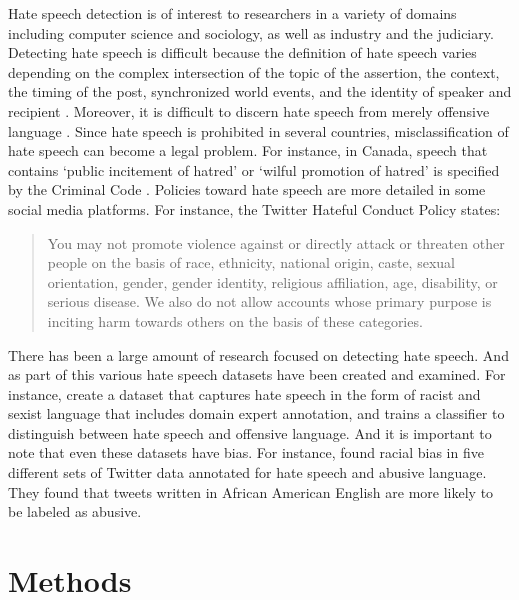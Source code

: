 \documentclass[12pt,]{article}
\begin{document}
Hate speech detection is of interest to researchers in a variety of domains including computer science and sociology, as well as industry and the judiciary. Detecting hate speech is difficult because the definition of hate speech varies depending on the complex intersection of the topic of the assertion, the context, the timing of the post, synchronized world events, and the identity of speaker and recipient \citep{schmidt2017survey}. Moreover, it is difficult to discern hate speech from merely offensive language \citep{davidson2017automated}. Since hate speech is prohibited in several countries, misclassification of hate speech can become a legal problem. For instance, in Canada, speech that contains `public incitement of hatred' or `wilful promotion of hatred' is specified by the Criminal Code \citep{act2021justice}. Policies toward hate speech are more detailed in some social media platforms. For instance, the Twitter Hateful Conduct Policy states:

\begin{quote}
You may not promote violence against or directly attack or threaten other people on the basis of race, ethnicity, national origin, caste, sexual orientation, gender, gender identity, religious affiliation, age, disability, or serious disease. We also do not allow accounts whose primary purpose is inciting harm towards others on the basis of these categories.

\citet{twitterpolicy2017}
\end{quote}

There has been a large amount of research focused on detecting hate speech. And as part of this various hate speech datasets have been created and examined. For instance, \citet{waseem2016hateful} create a dataset that captures hate speech in the form of racist and sexist language that includes domain expert annotation, and \citet{davidson2017automated} trains a classifier to distinguish between hate speech and offensive language. And it is important to note that even these datasets have bias. For instance, \citet{davidson2019racial} found racial bias in five different sets of Twitter data annotated for hate speech and abusive language. They found that tweets written in African American English are more likely to be labeled as abusive.

\hypertarget{methods}{%
\section{Methods}\label{methods}}
\end{document}
